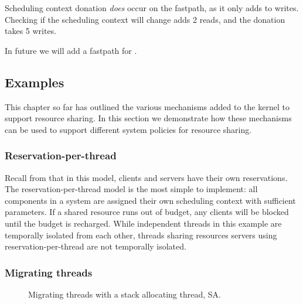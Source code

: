 Scheduling context donation \emph{does} occur on the fastpath, as it only adds to writes.
Checking if the scheduling context will change adds 2 reads, and the donation takes 5 writes.

In future we will add a fastpath for \sendrecv.

\subsection{Examples}

This chapter so far has outlined the various mechanisms added to the kernel to support resource sharing.
In this section we demonstrate how these mechanisms can be used to support different system policies for resource sharing.

\subsubsection{Reservation-per-thread}

Recall from  that in this model, clients and servers have their own reservations.
The reservation-per-thread model is the most simple to implement: all components in a system are assigned their own scheduling context with sufficient parameters.
If a shared resource runs out of budget, any clients will be blocked until the budget is recharged.
While independent threads in this example are temporally isolated from each other, threads sharing resources servers using reservation-per-thread are not temporally isolated.

\subsubsection{Migrating threads}

\begin{figure}
    \centering
    \caption{Migrating threads with a stack allocating thread, SA.}
    \label{fig:migrating-threads}
\end{figure}


